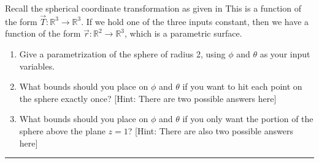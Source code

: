 \begin{problem}%
%

Recall the spherical coordinate transformation as given in 
%
%
This is a function of the form $\vec T\colon \mathbb{R}^3\to\mathbb{R}^3$.  If we hold one of the three inputs constant, then we have a function of the form $\vec r\colon \mathbb{R}^2\to\mathbb{R}^3$, which is a parametric surface.
\begin{enumerate}
 \item {}%
Give a parametrization of the sphere of radius 2, using $\phi$ and $\theta$ as your input variables. 
 \item What bounds should you place on $\phi$ and $\theta$ if you want to hit each point on the sphere exactly once? [Hint: There are two possible answers here]
 \item What bounds should you place on $\phi$ and $\theta$ if you only want the portion of the sphere above the plane $z=1$? [Hint: There are also two possible answers here]
\end{enumerate}
\end{problem}

\vskip0.1in
\hrule
\vskip0.1in


